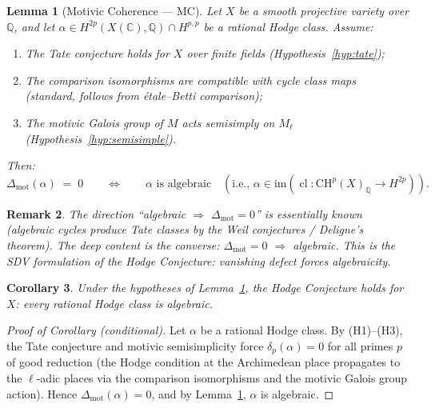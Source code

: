 \documentclass[11pt]{article}
\newtheorem{lemma}{Lemma}
\newtheorem{corollary}[lemma]{Corollary}
\newtheorem{remark}[lemma]{Remark}
\theoremstyle{definition}
\DeclareMathOperator{\cl}{cl}
\begin{document}
\begin{lemma}[Motivic Coherence --- MC]
\label{lem:MC}
Let $X$ be a smooth projective variety over $\mathbb{Q}$,
and let $\alpha \in H^{2p}(X(\mathbb{C}), \mathbb{Q}) \cap H^{p,p}$ be a rational Hodge class.
Assume:
\begin{enumerate}
  \item[(H1)] The Tate conjecture holds for $X$ over finite fields
    (Hypothesis~\ref{hyp:tate});
  \item[(H2)] The comparison isomorphisms are compatible with cycle class maps
    (standard, follows from \'etale--Betti comparison);
  \item[(H3)] The motivic Galois group of $M$ acts semisimply on $M_\ell$
    (Hypothesis~\ref{hyp:semisimple}).
\end{enumerate}
Then:
\[
  \Delta_{\mathrm{mot}}(\alpha) \;=\; 0
  \qquad \Longleftrightarrow \qquad
  \alpha \text{ is algebraic}
  \quad (\text{i.e., } \alpha \in \mathrm{im}(\cl : \mathrm{CH}^p(X)_{\mathbb{Q}} \to H^{2p})).
\]
\end{lemma}

\begin{remark}
The direction ``algebraic $\Rightarrow$ $\Delta_{\mathrm{mot}} = 0$'' is essentially known
(algebraic cycles produce Tate classes by the Weil conjectures / Deligne's theorem).
The deep content is the converse: $\Delta_{\mathrm{mot}} = 0$ $\Rightarrow$ algebraic.
This is the SDV formulation of the Hodge Conjecture:
vanishing defect forces algebraicity.
\end{remark}

\begin{corollary}
\label{cor:hodge}
Under the hypotheses of Lemma~\ref{lem:MC}, the Hodge Conjecture holds for $X$:
every rational Hodge class is algebraic.
\end{corollary}

\begin{proof}[Proof of Corollary (conditional)]
Let $\alpha$ be a rational Hodge class.  By (H1)--(H3), the Tate conjecture
and motivic semisimplicity force $\delta_p(\alpha) = 0$ for all primes $p$ of good reduction
(the Hodge condition at the Archimedean place propagates to the $\ell$-adic places
via the comparison isomorphisms and the motivic Galois group action).
Hence $\Delta_{\mathrm{mot}}(\alpha) = 0$, and by Lemma~\ref{lem:MC}, $\alpha$ is algebraic.
\end{proof}

\end{document}
